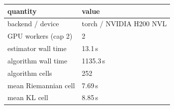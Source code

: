 \begin{tabular}{ll}
\toprule
quantity & value \\
\midrule
backend / device & torch / NVIDIA H200 NVL \\
GPU workers (cap 2) & 2 \\
estimator wall time & 13.1\,s \\
algorithm wall time & 1135.3\,s \\
algorithm cells & 252 \\
mean Riemannian cell & 7.69\,s \\
mean KL cell & 8.85\,s \\
\bottomrule
\end{tabular}
